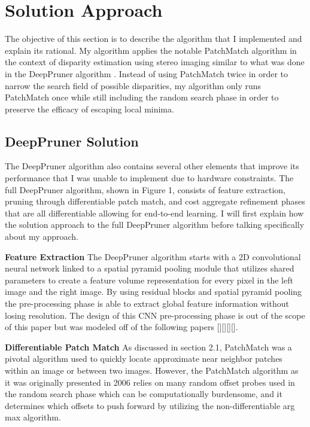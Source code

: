 \documentclass{article}
\begin{document}
\section{Solution Approach}

The objective of this section is to describe the algorithm that I implemented and explain its rational. My algorithm applies the notable PatchMatch algorithm \citep{patchmatch} in the context of disparity estimation using stereo imaging similar to what was done in the DeepPruner algorithm \citep{deeppruner}. Instead of using PatchMatch twice in order to narrow the search field of possible disparities, my algorithm only runs PatchMatch once while still including the random search phase in order to preserve the efficacy of escaping local minima.

\subsection{DeepPruner Solution}
The DeepPruner algorithm also contains several other elements that improve its performance that I was unable to implement due to hardware constraints. The full DeepPruner algorithm, shown in Figure 1, consists of feature extraction, pruning through differentiable patch match, and cost aggregate refinement phases that are all differentiable allowing for end-to-end learning. I will first explain how the solution approach to the full DeepPruner algorithm before talking specifically about my approach.

\textbf{Feature Extraction} The DeepPruner algorithm starts with a 2D convolutional neural network linked to a spatial pyramid pooling module that utilizes shared parameters to create a feature volume representation for every pixel in the left image and the right image. By using residual blocks and spatial pyramid pooling the pre-processing phase is able to extract global feature information without losing resolution. The design of this CNN pre-processing phase is out of the scope of this paper but was modeled off of the following papers [][][][].

\textbf{Differentiable Patch Match} As discussed in section 2.1, PatchMatch was a pivotal algorithm used to quickly locate approximate near neighbor patches within an image or between two images. However, the PatchMatch algorithm as it was originally presented in 2006 relies on many random offset probes used in the random search phase which can be computationally burdensome, and it determines which offsets to push forward by utilizing the non-differentiable arg max algorithm.
\end{document}
